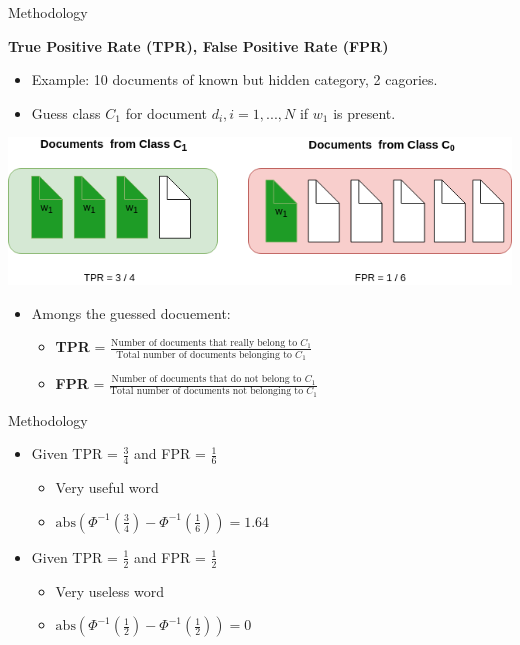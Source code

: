 \begin{frame}[label=metho]{Methodology}

	\textbf{True Positive Rate (TPR), False Positive Rate (FPR)}
	\begin{itemize}
		\item Example: 10 documents of known but hidden category, 2 cagories.
		\item Guess class $C_1$ for document $d_i, i = 1,...,N$ if $w_1$ is present.	
\end{itemize}

			\includegraphics[width=\textwidth]{images/TPRFPR_example.png}

	\begin{itemize}
		
			\item Amongs the guessed docuement:
		\begin{itemize}

			\item \textbf{TPR} = $\frac{\textrm{Number of documents that really belong to } C_1}{\textrm{Total number of documents belonging to } C_1} $
			\item \textbf{FPR} = $\frac{\textrm{Number of documents that do not belong to } C_1}{\textrm{Total number of documents not belonging to } C_1} $
		\end{itemize}
	\end{itemize}

			


\end{frame}

\begin{frame}[label=metho]{Methodology}
		\begin{itemize}
		\item Given TPR = $\frac{3}{4}$ and FPR = $\frac{1}{6}$
			\begin{itemize}
				\item Very useful word
				\item $\textrm{abs}(\Phi^{-1}(\frac{3}{4}) - \Phi^{-1}(\frac{1}{6}) ) = 1.64$ 
			\end{itemize}
		\item Given TPR = $\frac{1}{2}$  and FPR = $\frac{1}{2}$
		\begin{itemize}
			\item Very useless word
			\item $\textrm{abs}(\Phi^{-1}(\frac{1}{2}) - \Phi^{-1}(\frac{1}{2}) ) = 0$ 
		\end{itemize}
	
	\end{itemize}
\end{frame}

